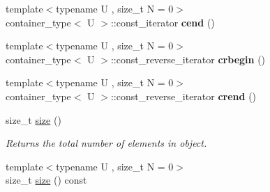 \begin{DoxyCompactItemize}
\item 
\hypertarget{classheterogeneous_1_1heterovector_3_01_t_00_01_types_8_8_8_4_a5854b5deabe059db780d83e9fabb99a8}{}{\footnotesize template$<$typename U , size\+\_\+t N = 0$>$ }\\container\+\_\+type$<$ U $>$\+::const\+\_\+iterator {\bfseries cend} ()\label{classheterogeneous_1_1heterovector_3_01_t_00_01_types_8_8_8_4_a5854b5deabe059db780d83e9fabb99a8}

\item 
\hypertarget{classheterogeneous_1_1heterovector_3_01_t_00_01_types_8_8_8_4_afbd197cd7ac9749c17dcfb713c5a7282}{}{\footnotesize template$<$typename U , size\+\_\+t N = 0$>$ }\\container\+\_\+type$<$ U $>$\+::const\+\_\+reverse\+\_\+iterator {\bfseries crbegin} ()\label{classheterogeneous_1_1heterovector_3_01_t_00_01_types_8_8_8_4_afbd197cd7ac9749c17dcfb713c5a7282}

\item 
\hypertarget{classheterogeneous_1_1heterovector_3_01_t_00_01_types_8_8_8_4_a604551f70068da52e379c1a5f6f5d07d}{}{\footnotesize template$<$typename U , size\+\_\+t N = 0$>$ }\\container\+\_\+type$<$ U $>$\+::const\+\_\+reverse\+\_\+iterator {\bfseries crend} ()\label{classheterogeneous_1_1heterovector_3_01_t_00_01_types_8_8_8_4_a604551f70068da52e379c1a5f6f5d07d}

\item 
\hypertarget{classheterogeneous_1_1heterovector_3_01_t_00_01_types_8_8_8_4_a5a5c77fa457498417231e43eee4057bc}{}size\+\_\+t \hyperlink{classheterogeneous_1_1heterovector_3_01_t_00_01_types_8_8_8_4_a5a5c77fa457498417231e43eee4057bc}{size} ()\label{classheterogeneous_1_1heterovector_3_01_t_00_01_types_8_8_8_4_a5a5c77fa457498417231e43eee4057bc}

\begin{DoxyCompactList}\small\item\em Returns the total number of elements in object. \end{DoxyCompactList}\item 
\hypertarget{classheterogeneous_1_1heterovector_3_01_t_00_01_types_8_8_8_4_adb46283e309899af9b9c0a4991821ca8}{}{\footnotesize template$<$typename U , size\+\_\+t N = 0$>$ }\\size\+\_\+t \hyperlink{classheterogeneous_1_1heterovector_3_01_t_00_01_types_8_8_8_4_adb46283e309899af9b9c0a4991821ca8}{size} () const \label{classheterogeneous_1_1heterovector_3_01_t_00_01_types_8_8_8_4_adb46283e309899af9b9c0a4991821ca8}


\end{DoxyCompactItemize}
